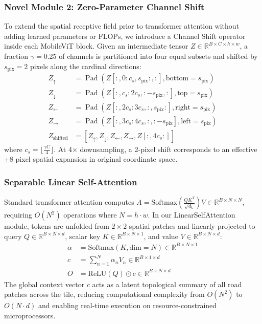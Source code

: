 \documentclass[conference]{IEEEtran}
\begin{document}
\subsubsection{Novel Module 2: Zero-Parameter Channel Shift}
To extend the spatial receptive field prior to transformer attention without adding learned parameters or FLOPs, we introduce a Channel Shift operator inside each MobileViT block. Given an intermediate tensor $Z \in \mathbb{R}^{B \times C \times h \times w}$, a fraction $\gamma = 0.25$ of channels is partitioned into four equal subsets and shifted by $s_{\text{pix}} = 2$ pixels along the cardinal directions:
\begin{align}
    Z_{\uparrow} &= \operatorname{Pad}\left(Z[:, 0:c_s, s_{\text{pix}}:, :], \text{bottom}=s_{\text{pix}}\right) \\
    Z_{\downarrow} &= \operatorname{Pad}\left(Z[:, c_s:2c_s, :-s_{\text{pix}}, :], \text{top}=s_{\text{pix}}\right) \\
    Z_{\leftarrow} &= \operatorname{Pad}\left(Z[:, 2c_s:3c_s, :, s_{\text{pix}}:], \text{right}=s_{\text{pix}}\right) \\
    Z_{\rightarrow} &= \operatorname{Pad}\left(Z[:, 3c_s:4c_s, :, :-s_{\text{pix}}], \text{left}=s_{\text{pix}}\right) \\
    Z_{\text{shifted}} &= \left[ Z_{\uparrow}, Z_{\downarrow}, Z_{\leftarrow}, Z_{\rightarrow}, Z[:, 4c_s:] \right]
\end{align}
where $c_s = \lfloor \frac{\gamma C}{4} \rfloor$. At 4$\times$ downsampling, a 2-pixel shift corresponds to an effective $\pm8$ pixel spatial expansion in original coordinate space.

\subsubsection{Separable Linear Self-Attention}
Standard transformer attention computes $A = \text{Softmax}\left(\frac{QK^T}{\sqrt{d_k}}\right)V \in \mathbb{R}^{B \times N \times N}$, requiring $O(N^2)$ operations where $N = h \cdot w$. In our LinearSelfAttention module, tokens are unfolded from $2\times2$ spatial patches and linearly projected to query $Q \in \mathbb{R}^{B \times N \times d}$, scalar key $K \in \mathbb{R}^{B \times N \times 1}$, and value $V \in \mathbb{R}^{B \times N \times d}$:
\begin{align}
    \alpha &= \text{Softmax}(K, \text{dim}=N) \in \mathbb{R}^{B \times N \times 1} \\
    c &= \sum_{n=1}^N \alpha_n V_n \in \mathbb{R}^{B \times 1 \times d} \\
    O &= \text{ReLU}(Q) \odot c \in \mathbb{R}^{B \times N \times d}
\end{align}
The global context vector $c$ acts as a latent topological summary of all road patches across the tile, reducing computational complexity from $O(N^2)$ to $O(N \cdot d)$ and enabling real-time execution on resource-constrained microprocessors.
\end{document}
